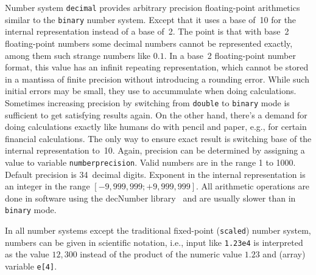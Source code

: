 Number system \texttt{decimal} provides
arbitrary precision floating-point arithmetics similar to the
\texttt{binary} number system.  Except that it uses a base of~10 for the
internal representation instead of a base of~2.  The point is that with
base~2 floating-point numbers some decimal numbers cannot be represented
exactly, among them such strange numbers like $0.1$.  In a base~2
floating-point number format, this value has an infinit repeating
representation, which cannot be stored in a mantissa of finite precision
without introducing a rounding error.  While such initial errors may be
small, they use to accummulate when doing calculations.  Sometimes
increasing precision by switching from \texttt{double} to
\texttt{binary} mode is sufficient to get satisfying results again.  On
the other hand, there's a demand for doing calculations exactly like
humans do with pencil and paper, e.g., for certain financial
calculations.  The only way to ensure exact result is switching base of
the internal representation to~10.  Again, precision can be determined
by assigning a value to variable
\texttt{numberprecision}.
Valid numbers are in the range 1 to 1000.  Default precision is
34~decimal digits.  Exponent in the internal representation is an
integer in the range $[-9,999,999; +9,999,999]$.  All arithmetic
operations are done in software using the decNumber
library~\cite{lib:decnumber} and are usually slower than in
\texttt{binary} mode.

In all number systems except the traditional fixed-point
(\texttt{scaled}) number system, numbers can be given in scientific
notation, i.e., input like \texttt{1.23e4} is interpreted as the value
$12,300$ instead of the product of the numeric value $1.23$ and (array)
variable \verb|e[4]|.



